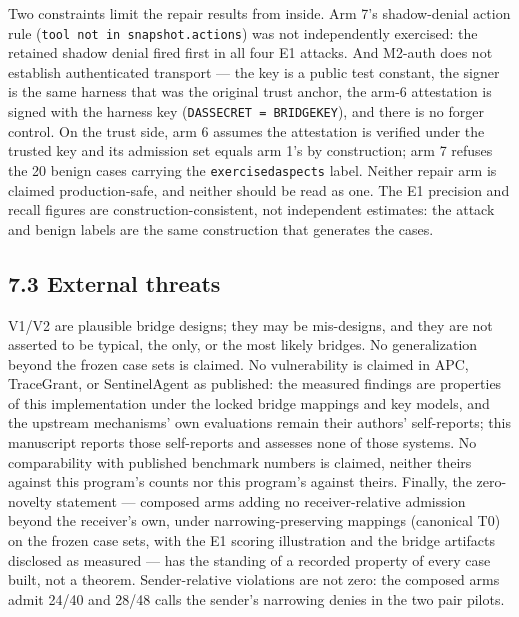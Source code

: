 \documentclass[
  10pt,
]{article}
\newcounter{none} %
\let\origtexttt\texttt
\renewcommand{\texttt}[1]{{\upshape\origtexttt{#1}}}
\renewcommand{\_}{\allowbreak\origunderscore}
\begin{document}
Two constraints limit the repair results from inside. Arm 7's
shadow-denial action rule (\texttt{tool\ not\ in\ snapshot.actions}) was
not independently exercised: the retained shadow denial fired first in
all four E1 attacks. And M2-auth does not establish authenticated
transport --- the key is a public test constant, the signer is the same
harness that was the original trust anchor, the arm-6 attestation is
signed with the harness key (\texttt{DAS\_SECRET\ =\ BRIDGE\_KEY}), and
there is no forger control. On the trust side, arm 6 assumes the
attestation is verified under the trusted key and its admission set
equals arm 1's by construction; arm 7 refuses the 20 benign cases
carrying the \texttt{exercised\_aspects} label. Neither repair arm is
claimed production-safe, and neither should be read as one. The E1
precision and recall figures are construction-consistent, not
independent estimates: the attack and benign labels are the same
construction that generates the cases.

\subsection{7.3 External threats}\label{external-threats}

V1/V2 are plausible bridge designs; they may be mis-designs, and they
are not asserted to be typical, the only, or the most likely bridges. No
generalization beyond the frozen case sets is claimed. No vulnerability
is claimed in APC, TraceGrant, or SentinelAgent as published: the
measured findings are properties of this implementation under the locked
bridge mappings and key models, and the upstream mechanisms' own
evaluations remain their authors' self-reports; this manuscript reports
those self-reports and assesses none of those systems. No comparability
with published benchmark numbers is claimed, neither theirs against this
program's counts nor this program's against theirs. Finally, the
zero-novelty statement --- composed arms adding no receiver-relative
admission beyond the receiver's own, under narrowing-preserving mappings
(canonical T0) on the frozen case sets, with the E1 scoring illustration
and the bridge artifacts disclosed as measured --- has the standing of a
recorded property of every case built, not a theorem. Sender-relative
violations are not zero: the composed arms admit 24/40 and 28/48 calls
the sender's narrowing denies in the two pair pilots.
\end{document}
